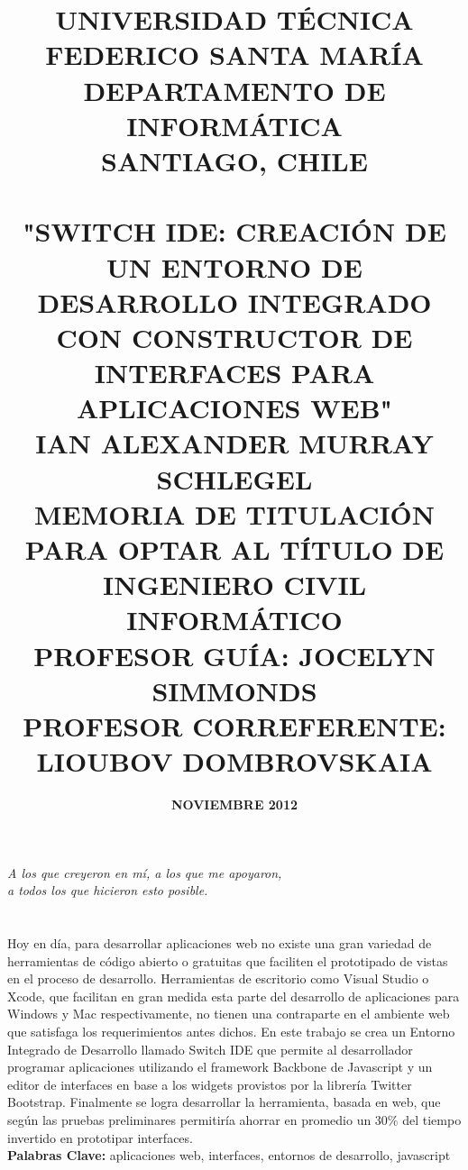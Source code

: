 \documentclass[12pt,spanish,letter]{report}
\title{
\vspace{-3cm}
{\fontsize{18}{22} {\textbf{UNIVERSIDAD TÉCNICA FEDERICO SANTA MARÍA}}} \\
{\fontsize{16}{22} \textbf{DEPARTAMENTO DE INFORMÁTICA}} \\
{\fontsize{14}{17} \textbf{SANTIAGO, CHILE}} \\[25mm]
\Oldincludegraphics[scale=0.7]{figures/logo_utfsm.png} \\[1\baselineskip]
{\fontsize{20}{24} \textbf{"SWITCH IDE: CREACIÓN DE UN ENTORNO DE DESARROLLO INTEGRADO CON CONSTRUCTOR DE INTERFACES PARA APLICACIONES WEB"}} \\[1\baselineskip]
{\fontsize{14}{17} \textbf{IAN ALEXANDER MURRAY SCHLEGEL}} \\[\baselineskip]
{\fontsize{12}{17} \textbf{MEMORIA DE TITULACIÓN PARA OPTAR AL TÍTULO DE INGENIERO CIVIL INFORMÁTICO}} \\[\baselineskip]
{\fontsize{12}{17} \textbf{PROFESOR GUÍA: JOCELYN SIMMONDS}} \\
{\fontsize{12}{17} \textbf{PROFESOR CORREFERENTE: LIOUBOV DOMBROVSKAIA}} \\
}
\date{\fontsize{14}{17} {\textbf{NOVIEMBRE 2012}}}
\makeatletter
\renewcommand{\baselinestretch}{0.8}
\renewenvironment{abstract}{%
  \if@twocolumn
    \section*{\abstractname}%
  \else
    \small
    \begin{center}%
      {\bfseries \abstractname \vspace{-.5em}\vspace{\z@}}%
    \end{center}%
    \quotation
  \fi}
  {\if@twocolumn\else\endquotation\fi}
\makeatother
\begin{document}

\maketitle

\renewcommand{\baselinestretch}{1}
\selectfont


\begin{flushright}
\vspace*{\fill}

\textit{A los que creyeron en mí, a los que me apoyaron,\\a todos los que hicieron esto posible.}

\vspace*{\fill}
\end{flushright}

\clearpage
\newpage

\vspace*{\fill}
\vspace{-2.5cm}
\begin{abstract}

Hoy en día, para desarrollar aplicaciones web no existe una gran variedad de herramientas de código abierto o gratuitas que faciliten el prototipado de vistas en el proceso de desarrollo. Herramientas de escritorio como Visual Studio o Xcode, que facilitan en gran medida esta parte del desarrollo de aplicaciones para Windows y Mac respectivamente, no tienen una contraparte en el ambiente web que satisfaga los requerimientos antes dichos. En este trabajo se crea un Entorno Integrado de Desarrollo llamado Switch IDE que permite al desarrollador programar aplicaciones utilizando el framework Backbone de Javascript y un editor de interfaces en base a los widgets provistos por la librería Twitter Bootstrap. Finalmente se logra desarrollar la herramienta, basada en web, que según las pruebas preliminares permitiría ahorrar en promedio un 30\% del tiempo invertido en prototipar interfaces.
\\[\baselineskip]
\textbf{Palabras Clave:} aplicaciones web, interfaces, entornos de desarrollo, javascript

\end{abstract}


{}
\end{document}
